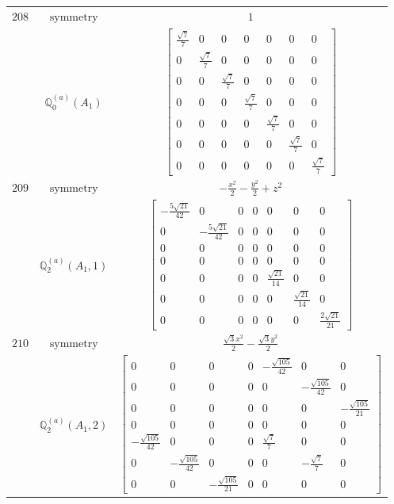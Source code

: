 \documentclass[fleqn,8pt,landscape]{jsarticle}
\begin{document}
\begin{longtable}{ccc}
$ 208 $ & $ \text{symmetry} $ & $ 1 $ \\
$  $ & $ \mathbb{Q}_{0}^{(a)}(A_{1}) $ & $ \begin{bmatrix} \frac{\sqrt{7}}{7} & 0 & 0 & 0 & 0 & 0 & 0 \\ 0 & \frac{\sqrt{7}}{7} & 0 & 0 & 0 & 0 & 0 \\ 0 & 0 & \frac{\sqrt{7}}{7} & 0 & 0 & 0 & 0 \\ 0 & 0 & 0 & \frac{\sqrt{7}}{7} & 0 & 0 & 0 \\ 0 & 0 & 0 & 0 & \frac{\sqrt{7}}{7} & 0 & 0 \\ 0 & 0 & 0 & 0 & 0 & \frac{\sqrt{7}}{7} & 0 \\ 0 & 0 & 0 & 0 & 0 & 0 & \frac{\sqrt{7}}{7} \end{bmatrix} $ \\ \hline
$ 209 $ & $ \text{symmetry} $ & $ - \frac{x^{2}}{2} - \frac{y^{2}}{2} + z^{2} $ \\
$  $ & $ \mathbb{Q}_{2}^{(a)}(A_{1},1) $ & $ \begin{bmatrix} - \frac{5 \sqrt{21}}{42} & 0 & 0 & 0 & 0 & 0 & 0 \\ 0 & - \frac{5 \sqrt{21}}{42} & 0 & 0 & 0 & 0 & 0 \\ 0 & 0 & 0 & 0 & 0 & 0 & 0 \\ 0 & 0 & 0 & 0 & 0 & 0 & 0 \\ 0 & 0 & 0 & 0 & \frac{\sqrt{21}}{14} & 0 & 0 \\ 0 & 0 & 0 & 0 & 0 & \frac{\sqrt{21}}{14} & 0 \\ 0 & 0 & 0 & 0 & 0 & 0 & \frac{2 \sqrt{21}}{21} \end{bmatrix} $ \\ \hline
$ 210 $ & $ \text{symmetry} $ & $ \frac{\sqrt{3} x^{2}}{2} - \frac{\sqrt{3} y^{2}}{2} $ \\
$  $ & $ \mathbb{Q}_{2}^{(a)}(A_{1},2) $ & $ \begin{bmatrix} 0 & 0 & 0 & 0 & - \frac{\sqrt{105}}{42} & 0 & 0 \\ 0 & 0 & 0 & 0 & 0 & - \frac{\sqrt{105}}{42} & 0 \\ 0 & 0 & 0 & 0 & 0 & 0 & - \frac{\sqrt{105}}{21} \\ 0 & 0 & 0 & 0 & 0 & 0 & 0 \\ - \frac{\sqrt{105}}{42} & 0 & 0 & 0 & \frac{\sqrt{7}}{7} & 0 & 0 \\ 0 & - \frac{\sqrt{105}}{42} & 0 & 0 & 0 & - \frac{\sqrt{7}}{7} & 0 \\ 0 & 0 & - \frac{\sqrt{105}}{21} & 0 & 0 & 0 & 0 \end{bmatrix} $ \\ \hline

\end{longtable}
\end{document}

